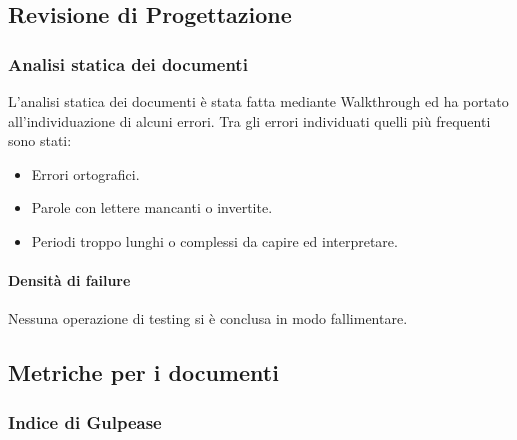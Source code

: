 \subsection{Revisione di Progettazione}

\subsubsection{Analisi statica dei documenti}
L'analisi statica dei documenti è stata fatta mediante Walkthrough ed ha portato all'individuazione di alcuni errori. Tra gli errori individuati quelli più frequenti sono stati:
		\begin{itemize}
			\item Errori ortografici.
			\item Parole con lettere mancanti o invertite.
			\item Periodi troppo lunghi o complessi da capire ed interpretare.
		\end{itemize}

\paragraph{Densità di failure}

Nessuna operazione di testing si è conclusa in modo fallimentare.

\subsection{Metriche per i documenti}

\subsubsection{Indice di Gulpease}

